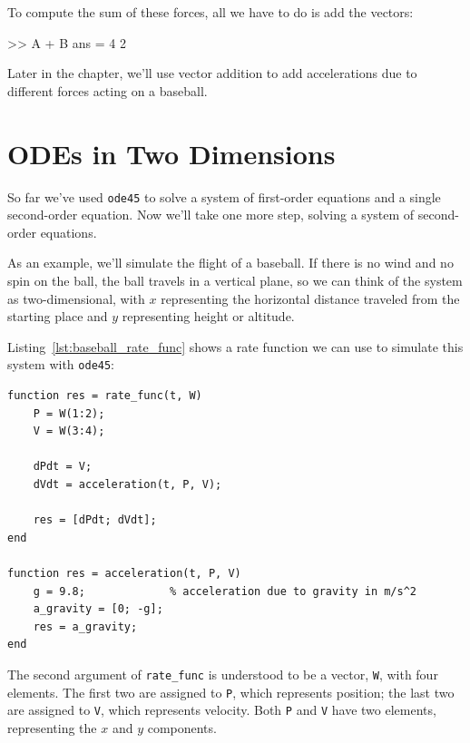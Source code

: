To compute the sum of these forces, all we have to do is add the vectors:

\begin{code}
>> A + B
ans = 4     2
\end{code}

Later in the chapter, we'll use vector addition to add accelerations due to different forces acting on a baseball.


\section{ODEs in Two Dimensions}
\label{projectile}

So far we've used \lstinline{ode45} to solve a system of first-order equations and a single second-order equation.  Now we'll take one more step, solving a system \linebreak of second-order equations.

As an example, we'll simulate the flight of a baseball.
If there is no wind and no spin on the ball, the ball travels in a vertical plane, so we can think of the system as two-dimensional, with $x$ representing the horizontal distance
traveled from the starting place and $y$ representing height or altitude.


Listing~\ref{lst:baseball_rate_func} shows a rate function we can use to simulate this system with \lstinline{ode45}:

\begin{lstlisting}[caption={A rate function we can use to model the flight of a baseball}, label={lst:baseball_rate_func}]
function res = rate_func(t, W)
    P = W(1:2);
    V = W(3:4);

    dPdt = V;
    dVdt = acceleration(t, P, V);

    res = [dPdt; dVdt];
end

function res = acceleration(t, P, V)
    g = 9.8;             % acceleration due to gravity in m/s^2
    a_gravity = [0; -g];
    res = a_gravity;
end
\end{lstlisting}

The second argument of \lstinline{rate_func} is understood to be a vector,
\lstinline{W}, with four elements.  The first two are assigned to \lstinline{P},
which represents position; the last two are assigned to \lstinline{V}, which
represents velocity. Both \lstinline{P} and \lstinline{V} have two elements,
representing the $x$ and $y$ components.

